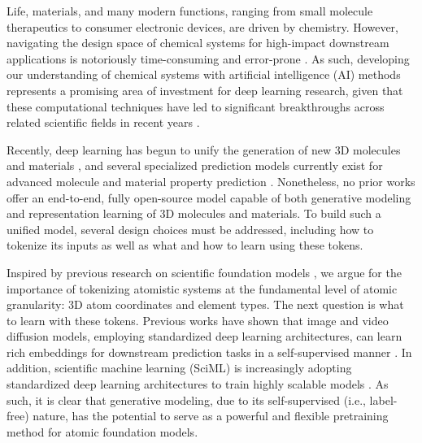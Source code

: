 \documentclass{article}
\theoremstyle{plain}
\theoremstyle{definition}
\theoremstyle{remark}
\begin{document}
Life, materials, and many modern functions, ranging from small molecule therapeutics to consumer electronic devices, are driven by chemistry. 
However, navigating the design space of chemical systems for high-impact downstream applications is notoriously time-consuming and error-prone \citep{blanco2023role, venkatasubramanian2019promise, wang2023scientific}. 
As such, developing our understanding of chemical systems with artificial intelligence (AI) methods represents a promising area of investment for deep learning research, given that these computational techniques have led to significant breakthroughs across related scientific fields in recent years \citep{jumper2021highly, abramson2024accurate}.

Recently, deep learning has begun to unify the generation of new 3D molecules and materials \citep{joshi2025allatom,zhang2025unigenx}, and several specialized prediction models currently exist for advanced molecule and material property prediction \citep{liao2023equiformer, qu2024escaip}. 
Nonetheless, no prior works offer an end-to-end, fully open-source model capable of both generative modeling and representation learning of 3D molecules and materials. 
To build such a unified model, several design choices must be addressed, including how to tokenize its inputs as well as what and how to learn using these tokens.

Inspired by previous research on scientific foundation models \citep{subramanian2023scifm, abramson2024accurate}, we argue for the importance of tokenizing atomistic systems at the fundamental level of atomic granularity: 3D atom coordinates and element types. The next question is what to learn with these tokens. Previous works have shown that image and video diffusion models, employing standardized deep learning architectures, can learn rich embeddings for downstream prediction tasks in a self-supervised manner \citep{li2023image, velez2025video}. In addition, scientific machine learning (SciML) is increasingly adopting standardized deep learning architectures to train highly scalable models \citep{abramson2024accurate, kreiman2025transformers,wadell2025foundation}. As such, it is clear that generative modeling, due to its self-supervised (i.e., label-free) nature, has the potential to serve as a powerful and flexible pretraining method for atomic foundation models.

%         
\end{document}
